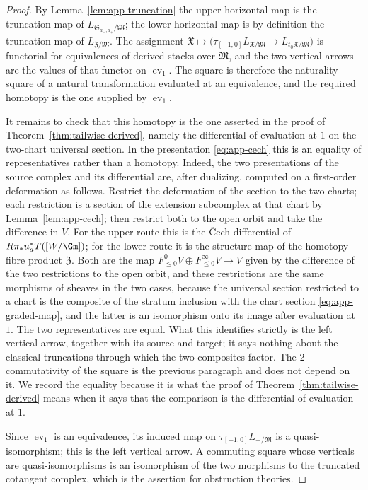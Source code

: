 \begin{proof}
By Lemma~\ref{lem:app-truncation} the upper horizontal map is the truncation
map of \(L_{\mathfrak S_{a_-,a_+}/\mathfrak M}\); the lower horizontal map is
by definition the truncation map of \(L_{\mathfrak Z/\mathfrak M}\).  The
assignment \(\mathfrak X\mapsto\bigl(\tau_{[-1,0]}L_{\mathfrak X/\mathfrak
M}\to L_{t_0\mathfrak X/\mathfrak M}\bigr)\) is functorial for equivalences of
derived stacks over \(\mathfrak M\), and the two vertical arrows are the values
of that functor on \(\operatorname{ev}_1\).  The square is therefore the
naturality square of a natural transformation evaluated at an equivalence, and
the required homotopy is the one supplied by \(\operatorname{ev}_1\).

It remains to check that this homotopy is the one asserted in the proof of
Theorem~\ref{thm:tailwise-derived}, namely the differential of evaluation at
\(1\) on the two-chart universal section.  In the presentation
\eqref{eq:app-cech} this is an equality of representatives rather than a
homotopy.  Indeed, the two presentations of the source complex and its
differential are, after dualizing,
computed on a first-order deformation as follows.  Restrict the deformation of
the section to the two charts; each restriction is a section of the extension
subcomplex at that chart by Lemma~\ref{lem:app-cech}; then restrict both to the
open orbit and take the difference in \(V\).  For the upper route this is the
\v{C}ech differential of \(R\pi_*u_a^*T([W/\Gm])\); for the lower route it is
the structure map of the homotopy fibre product \(\mathfrak Z\).  Both are the
map \(F^0_{\leq0}V\oplus F^\infty_{\leq0}V\to V\) given by the difference of
the two restrictions to the open orbit, and these restrictions are the same
morphisms of sheaves in the two cases, because the universal section restricted
to a chart is the composite of the stratum inclusion with the chart section
\eqref{eq:app-graded-map}, and the latter is an isomorphism onto its image
after evaluation at \(1\).  The two representatives are equal.  What this
identifies strictly is the left vertical arrow, together with its source and
target; it says nothing about the classical truncations through
which the two composites factor.  The \(2\)-commutativity of the square is the
previous paragraph and does not depend on it.  We record the equality because
it is what the proof of Theorem~\ref{thm:tailwise-derived} means when it says
that the comparison is the differential of evaluation at \(1\).

Since \(\operatorname{ev}_1\) is an equivalence, its induced map on
\(\tau_{[-1,0]}L_{-/\mathfrak M}\) is a quasi-isomorphism; this is the left
vertical arrow.  A commuting square whose verticals are quasi-isomorphisms is
an isomorphism of the two morphisms to the truncated cotangent complex, which
is the assertion for obstruction theories.


\end{proof}
